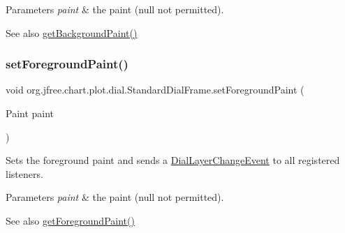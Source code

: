 \begin{DoxyParams}{Parameters}
{\em paint} & the paint ({\ttfamily null} not permitted).\\
\hline
\end{DoxyParams}
\begin{DoxySeeAlso}{See also}
\mbox{\hyperlink{classorg_1_1jfree_1_1chart_1_1plot_1_1dial_1_1_standard_dial_frame_a4013ea01b3765b274b3d99978a54eba7}{get\+Background\+Paint()}} 
\end{DoxySeeAlso}
\mbox{\label{classorg_1_1jfree_1_1chart_1_1plot_1_1dial_1_1_standard_dial_frame_a5d1e2b7bc485b692abc4e28cd2d2ea5e}} 
\subsubsection{\texorpdfstring{set\+Foreground\+Paint()}{setForegroundPaint()}}
{\footnotesize\ttfamily void org.\+jfree.\+chart.\+plot.\+dial.\+Standard\+Dial\+Frame.\+set\+Foreground\+Paint (\begin{DoxyParamCaption}\item[{Paint}]{paint }\end{DoxyParamCaption})}

Sets the foreground paint and sends a \mbox{\hyperlink{classorg_1_1jfree_1_1chart_1_1plot_1_1dial_1_1_dial_layer_change_event}{Dial\+Layer\+Change\+Event}} to all registered listeners.


\begin{DoxyParams}{Parameters}
{\em paint} & the paint ({\ttfamily null} not permitted).\\
\hline
\end{DoxyParams}
\begin{DoxySeeAlso}{See also}
\mbox{\hyperlink{classorg_1_1jfree_1_1chart_1_1plot_1_1dial_1_1_standard_dial_frame_ac5647162c4aa638d569d1fb72337d354}{get\+Foreground\+Paint()}} 
\end{DoxySeeAlso}
\mbox{\label{classorg_1_1jfree_1_1chart_1_1plot_1_1dial_1_1_standard_dial_frame_a775d5be898cb10aed3d5b8489673b0f4}} 
